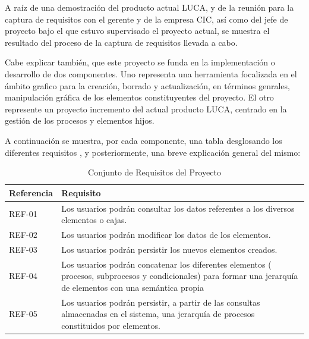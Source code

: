 \documentclass[a4paper,12pt]{book}
\begin{document}
		A raíz de una demostración del producto actual LUCA, y de la reunión para la captura de requisitos con el gerente y de la empresa CIC, así como del jefe de proyecto bajo el que estuvo supervisado el proyecto actual, se muestra el resultado del proceso de la captura de requisitos llevada a cabo. 
		
		\vspace{5mm}
		
		Cabe explicar también, que este proyecto se funda en la implementación o desarrollo de dos componentes. Uno  representa una herramienta focalizada en el ámbito grafico para la creación, borrado y actualización, en términos genrales, manipulación gráfica de los elementos constituyentes del proyecto. El otro represente un proyecto incremento del actual producto LUCA, centrado en la gestión de los procesos y elementos hijos.
		
		\vspace{5mm}
		A continuación se muestra, por cada componente, una tabla desglosando los diferentes requisitos , y posteriormente, una breve explicación general del mismo:
		
		
		\begin{table}[H]
			\begin{center}
				\begin{tabular}{|l|l|}
					\hline
					Referencia & Requisito \\
					\hline \hline
					REF-01 & Los usuarios podrán consultar los datos referentes a los diversos elementos o cajas. \\ \hline
					REF-02 & Los usuarios podrán modificar los datos de los elementos. \\ \hline
					REF-03 & Los usuarios podrán persistir los nuevos elementos creados. \\ \hline
					REF-04 & Los usuarios podrán concatenar los diferentes elementos ( procesos, subprocesos y condicionales) para formar una jerarquía de elementos con una semántica propia\\ \hline
					REF-05 & Los usuarios podrán persistir, a partir de las consultas almacenadas en el sistema, una jerarquía de procesos constituidos por elementos. \\ \hline

				\end{tabular}
				\caption{Conjunto de Requisitos del Proyecto}
				\label{tabla:requisitosProceso}
			\end{center}
		\end{table}
	
\end{document}

